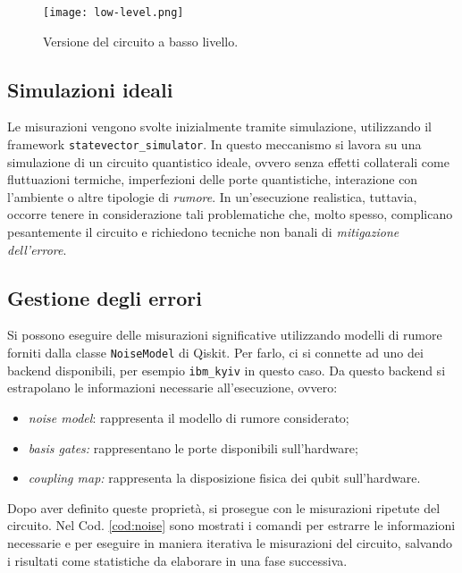 \begin{figure}[ht]
    \texttt{[image: low-level.png]}
    \caption{Versione del circuito a basso livello.}
		\label{fig:circuito-2x2}
\end{figure}

\subsection{Simulazioni ideali}
Le misurazioni vengono svolte inizialmente tramite simulazione, utilizzando 
il framework \texttt{statevector\_simulator}. In questo meccanismo si lavora su 
una simulazione di un circuito quantistico ideale, ovvero senza effetti collaterali come
fluttuazioni termiche, imperfezioni delle porte quantistiche, interazione con l'ambiente 
o altre tipologie di \textit{rumore}.
In un'esecuzione realistica, tuttavia, occorre tenere in considerazione
tali problematiche che, molto spesso, complicano pesantemente
il circuito e richiedono tecniche non banali di \textit{mitigazione dell'errore}.

\subsection{Gestione degli errori}
Si possono eseguire delle misurazioni significative utilizzando modelli 
di rumore forniti dalla classe \texttt{NoiseModel} di Qiskit. 
Per farlo, ci si connette ad uno dei backend disponibili, per esempio 
\texttt{ibm\_kyiv} in questo caso. Da questo backend si estrapolano le 
informazioni necessarie all'esecuzione, ovvero:
\begin{itemize}
	\item \emph{noise model}: rappresenta il modello di rumore considerato;
		\item \emph{basis gates:} rappresentano le porte disponibili sull'hardware;
		\item \emph{coupling map:} rappresenta la disposizione fisica dei qubit sull'hardware.
\end{itemize}
Dopo aver definito queste proprietà, si prosegue con le misurazioni 
ripetute del circuito. Nel Cod. \ref{cod:noise} sono mostrati 
i comandi per estrarre le informazioni necessarie e per eseguire 
in maniera iterativa le misurazioni del circuito, salvando i risultati 
come statistiche da elaborare in una fase successiva.

